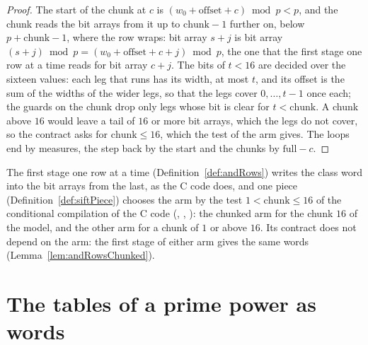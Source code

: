 \begin{proof}
  \leanok
  The start of the chunk at $c$ is $(w_0 + \mathrm{offset} + c) \bmod p < p$, and the chunk reads
  the bit arrays from it up to $\mathrm{chunk} - 1$ further on, below $p + \mathrm{chunk} - 1$,
  where the row wraps: bit array $s + j$ is bit array $(s + j) \bmod p = (w_0 + \mathrm{offset} + c
  + j) \bmod p$, the one that the first stage one row at a time reads for bit array $c + j$. The
  bits of $t < 16$ are decided over the sixteen values: each leg that runs has its width, at most
  $t$, and its offset is the sum of the widths of the wider legs, so that the legs cover $0, \dots,
  t - 1$ once each; the guards on the chunk drop only legs whose bit is clear for $t <
  \mathrm{chunk}$. A chunk above $16$ would leave a tail of $16$ or more bit arrays, which the legs
  do not cover, so the contract asks for $\mathrm{chunk} \le 16$, which the test of the arm gives.
  The loops end by measures, the step back by the start and the chunks by $\mathrm{full} - c$.
\end{proof}

The first stage one row at a time (Definition~\ref{def:andRows}) writes the class word into the bit
arrays from the last, as the C code does, and one piece (Definition~\ref{def:siftPiece}) chooses the
arm by the test $1 < \mathrm{chunk} \le 16$ of the conditional compilation of the C code
(, , ): the chunked
arm for the chunk $16$ of the model, and the other arm for a chunk of $1$ or above $16$. Its
contract does not depend on the arm: the first stage of either arm gives the same words
(Lemma~\ref{lem:andRowsChunked}).

\section{The tables of a prime power as words}\label{sec:powerWords}

